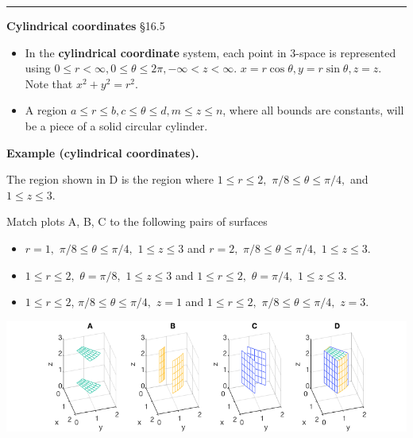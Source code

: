 \documentclass[12pt,letterpaper,noanswers]{exam}
\begin{document}
\vspace{0.2cm}
\hrule
\vspace{0.2cm}

\noindent\textbf{Cylindrical coordinates} \S 16.5
\begin{tcolorbox}
\begin{itemize}
\itemsep0em
    \item  In the \textbf{cylindrical coordinate} system, each point in $3$-space is represented using $0\leq r < \infty, 0\leq \theta\leq 2\pi, -\infty < z < \infty.$  $x = r\cos\theta, y = r\sin\theta, z = z.$  Note that $x^2+y^2 = r^2.$
    \item A region $a\leq r\leq b, c\leq \theta\leq d, m\leq z \leq n$, where all bounds are constants, will be a piece of a solid circular cylinder.
    \end{itemize}
    \end{tcolorbox}
    
    \noindent\textbf{Example (cylindrical coordinates).} 

The region shown in D is the region where $1\leq r \leq 2,$  $\pi/8\leq \theta\leq \pi/4,$ and $ 1\leq z \leq 3.$

Match plots A, B, C to the following pairs of surfaces
\begin{itemize}
\item
$r = 1,$ $\pi/8\leq \theta\leq \pi/4,$ $ 1\leq z \leq 3$ and  $r = 2,$ $\pi/8\leq \theta\leq \pi/4,$ $ 1\leq z \leq 3.$
\item $1\leq r \leq 2,$ $\theta = \pi/8,$ $ 1\leq z \leq 3$ and  $1\leq r \leq 2,$ $ \theta =  \pi/4,$ $ 1\leq z \leq 3.$
\item $1\leq r \leq 2$, $\pi/8\leq \theta\leq \pi/4,$ $ z = 1$ and  $1\leq r \leq 2,$ $\pi/8\leq \theta\leq \pi/4,$ $z = 3.$  %
\end{itemize}

\includegraphics[width=\linewidth]{img/C20p1.png}
    
    \eject
    
\end{document}
